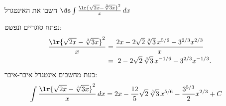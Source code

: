 חשבו את האינטגרל
$\ds \int \frac{\lr{\sqrt{2x}-\sqrt[3]{3x}}^{2}}{x}\,dx$
\begin{solbox}
נפתח סוגריים ונפשט:
\begin{align*}
\frac{\lr{\sqrt{2x}-\sqrt[3]{3x}}^{2}}{x}
&=\frac{2x-2\sqrt2\,\sqrt[3]{3}\,x^{5/6}-3^{2/3}x^{2/3}}{x}\\
&=\ 2-2\sqrt2\,\sqrt[3]{3}\,x^{-1/6}-3^{2/3}x^{-1/3}.
\end{align*}
כעת מחשבים אינטגרל איבר-איבר:
\begin{align*}
\int \frac{\lr{\sqrt{2x}-\sqrt[3]{3x}}^{2}}{x}\,dx
&=2x-\frac{12}{5}\sqrt2\,\sqrt[3]{3}\,x^{5/6}-\frac{3^{5/3}}{2}x^{2/3}+C
\end{align*}
\end{solbox}
